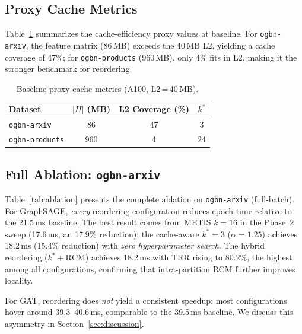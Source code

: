 \documentclass[sigconf,review]{acmart}
\begin{document}
\subsection{Proxy Cache Metrics}

Table~\ref{tab:proxy} summarizes the cache-efficiency proxy values at baseline. For \texttt{ogbn-arxiv}, the feature matrix (86\,MB) exceeds the 40\,MB L2, yielding a cache coverage of 47\%; for \texttt{ogbn-products} (960\,MB), only 4\% fits in L2, making it the stronger benchmark for reordering.

\begin{table}[h]
\centering
\caption{Baseline proxy cache metrics (A100, L2\,=\,40\,MB).}
\label{tab:proxy}
\begin{tabular}{lccc}
\toprule
\textbf{Dataset} & \textbf{$|H|$ (MB)} & \textbf{L2 Coverage (\%)} & \textbf{$k^*$} \\
\midrule
\texttt{ogbn-arxiv}    &  86 & 47 &  3 \\
\texttt{ogbn-products} & 960 &  4 & 24 \\
\bottomrule
\end{tabular}
\end{table}

\subsection{Full Ablation: \texttt{ogbn-arxiv}}

Table~\ref{tab:ablation} presents the complete ablation on \texttt{ogbn-arxiv} (full-batch).
For GraphSAGE, \emph{every} reordering configuration reduces epoch time relative to the 21.5\,ms baseline.
The best result comes from METIS $k{=}16$ in the Phase~2 sweep (17.6\,ms, an 17.9\% reduction);
the cache-aware $k^*{=}3$ ($\alpha{=}1.25$) achieves 18.2\,ms (15.4\% reduction) with \emph{zero hyperparameter search}.
The hybrid reordering ($k^*{+}\text{RCM}$) achieves 18.2\,ms with TRR rising to 80.2\%, the highest among all configurations, confirming that intra-partition RCM further improves locality.

For GAT, reordering does \emph{not} yield a consistent speedup: most configurations hover around 39.3--40.6\,ms, comparable to the 39.5\,ms baseline.
We discuss this asymmetry in Section~\ref{sec:discussion}.
\end{document}
